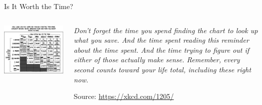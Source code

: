 
\begin{frame}{Is It Worth the Time?}
%
\begin{columns}[T]
\includegraphics[width=\linewidth]{./gfx/xkcd-isItWorthTheTime}
%
\begin{center}
\emph{Don't forget the time you spend finding the chart to look up what you save. And the time spent reading this reminder about the time spent. And the time trying to figure out if either of those actually make sense. Remember, every second counts toward your life total, including these right now.}

\vspace{6pt}
Source: \url{https://xkcd.com/1205/}
\end{center}

\end{columns}
%
\end{frame}



